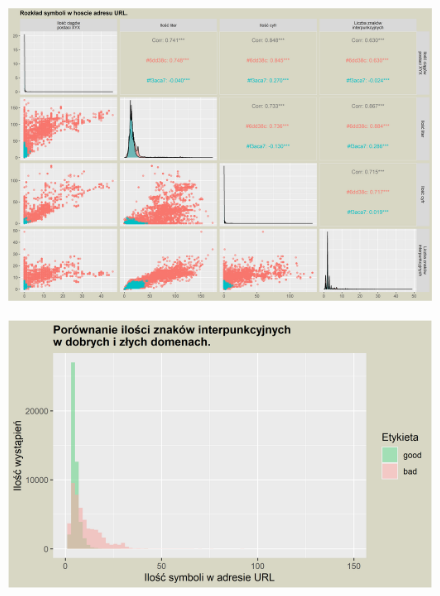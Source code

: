 \documentclass{beamer}
\begin{document}
\begin{frame}	
	\begin{figure}
		\centering
		\includegraphics[width=1\linewidth]{../images/plot_4}
	\end{figure}
\end{frame}
\begin{frame}
	\begin{figure}
		\centering
		\includegraphics[width=1\linewidth]{../images/plot_5}
	\end{figure}
\end{frame}
\end{document}
